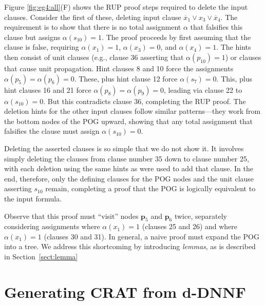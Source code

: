 \documentclass[letterpaper,USenglish,cleveref, autoref, thm-restate]{lipics-v2021}
\newcommand{\obar}[1]{\overline{#1}}
\newcommand{\assign}{\alpha}
\newcommand{\makenode}[1]{\mathbf{#1}}
\newcommand{\nodep}{\makenode{p}}
\begin{document}
Figure \ref{fig:eg4:all}(F) shows the RUP proof steps required to
delete the input clauses.  Consider the first of these, deleting
input clause $\obar{x}_1 \lor x_3 \lor \obar{x}_4$.  The requirement is to show
that there is no total assignment $\assign$ that falsifies this clause but assigns $\assign(s_{10}) = 1$.
The proof proceeds by first assuming that the clause is false, requiring
$\assign(x_1) = 1$, $\assign(x_3) = 0$, and $\assign(x_4) = 1$.  The hints then consist of unit
clauses (e.g., clause 36 asserting that $\alpha(p_{10}) = 1$) or
clauses that cause unit propagation.  Hint clauses 8 and 10 force the
assignments $\assign(p_5) = \assign(p_6) = 0$.  These, plus hint clause 12 force
$\assign(s_7) = 0$.  This, plus hint clauses 16 and 21 force $\assign(p_8) = \assign(p_9) = 0$, leading
via clause 22 to $\assign(s_{10}) = 0$.  But this contradicts clause 36,
completing the RUP proof.  The deletion hints for the other input
clauses follow similar patterns---they work from the bottom nodes of
the POG upward, showing that any total assignment that falsifies the clause
must assign $\assign(s_{10}) = 0$.

Deleting the asserted clauses is so simple that we do not show it.  It
involves simply deleting the clauses from clause number 35 down to
clause number 25, with each deletion using the same hints as were used
to add that clause.  In the end, therefore, only the defining clauses
for the POG nodes and the unit clause asserting $s_{10}$ remain,
completing a proof that the POG is logically equivalent to the input
formula.

Observe that this proof must ``visit'' nodes
$\nodep_5$ and $\nodep_6$ twice, separately considering  assignments where $\assign(x_1) = 1$
(clauses 25 and 26) and where $\assign(x_1) = 1$ (clauses 30 and 31).  In
general, a naive proof must expand the POG into a tree.
We address this shortcoming by introducing {\em lemmas}, as is described in Section~\ref{sect:lemma}


\section{Generating CRAT from d-DNNF}
\label{section:generating:crat}
\end{document}

